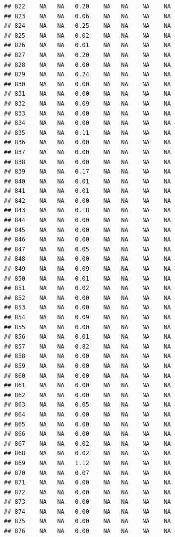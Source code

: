 \documentclass{article}\usepackage{graphicx, color}
\makeatletter
\newenvironment{kframe}{%
 \def\at@end@of@kframe{}%
 \ifinner\ifhmode%
  \def\at@end@of@kframe{\end{minipage}}%
  \begin{minipage}{\columnwidth}%
 \fi\fi%
 \def\FrameCommand##1{\hskip\@totalleftmargin \hskip-\fboxsep
 \colorbox{shadecolor}{##1}\hskip-\fboxsep
     \hskip-\linewidth \hskip-\@totalleftmargin \hskip\columnwidth}%
 \MakeFramed {\advance\hsize-\width
   \@totalleftmargin\z@ \linewidth\hsize
   \@setminipage}}%
 {\par\unskip\endMakeFramed%
 \at@end@of@kframe}
\newenvironment{knitrout}{}{} %
\makeatother
\begin{document}
\begin{knitrout}
\begin{kframe}
\begin{verbatim}
## 822    NA   NA   0.20    NA   NA    NA    NA
## 823    NA   NA   0.06    NA   NA    NA    NA
## 824    NA   NA   0.25    NA   NA    NA    NA
## 825    NA   NA   0.02    NA   NA    NA    NA
## 826    NA   NA   0.01    NA   NA    NA    NA
## 827    NA   NA   0.20    NA   NA    NA    NA
## 828    NA   NA   0.00    NA   NA    NA    NA
## 829    NA   NA   0.24    NA   NA    NA    NA
## 830    NA   NA   0.00    NA   NA    NA    NA
## 831    NA   NA   0.00    NA   NA    NA    NA
## 832    NA   NA   0.09    NA   NA    NA    NA
## 833    NA   NA   0.00    NA   NA    NA    NA
## 834    NA   NA   0.00    NA   NA    NA    NA
## 835    NA   NA   0.11    NA   NA    NA    NA
## 836    NA   NA   0.00    NA   NA    NA    NA
## 837    NA   NA   0.00    NA   NA    NA    NA
## 838    NA   NA   0.00    NA   NA    NA    NA
## 839    NA   NA   0.17    NA   NA    NA    NA
## 840    NA   NA   0.01    NA   NA    NA    NA
## 841    NA   NA   0.01    NA   NA    NA    NA
## 842    NA   NA   0.00    NA   NA    NA    NA
## 843    NA   NA   0.18    NA   NA    NA    NA
## 844    NA   NA   0.00    NA   NA    NA    NA
## 845    NA   NA   0.00    NA   NA    NA    NA
## 846    NA   NA   0.00    NA   NA    NA    NA
## 847    NA   NA   0.05    NA   NA    NA    NA
## 848    NA   NA   0.00    NA   NA    NA    NA
## 849    NA   NA   0.09    NA   NA    NA    NA
## 850    NA   NA   0.01    NA   NA    NA    NA
## 851    NA   NA   0.02    NA   NA    NA    NA
## 852    NA   NA   0.00    NA   NA    NA    NA
## 853    NA   NA   0.00    NA   NA    NA    NA
## 854    NA   NA   0.09    NA   NA    NA    NA
## 855    NA   NA   0.00    NA   NA    NA    NA
## 856    NA   NA   0.01    NA   NA    NA    NA
## 857    NA   NA   0.82    NA   NA    NA    NA
## 858    NA   NA   0.00    NA   NA    NA    NA
## 859    NA   NA   0.00    NA   NA    NA    NA
## 860    NA   NA   0.00    NA   NA    NA    NA
## 861    NA   NA   0.00    NA   NA    NA    NA
## 862    NA   NA   0.00    NA   NA    NA    NA
## 863    NA   NA   0.05    NA   NA    NA    NA
## 864    NA   NA   0.00    NA   NA    NA    NA
## 865    NA   NA   0.00    NA   NA    NA    NA
## 866    NA   NA   0.00    NA   NA    NA    NA
## 867    NA   NA   0.02    NA   NA    NA    NA
## 868    NA   NA   0.02    NA   NA    NA    NA
## 869    NA   NA   1.12    NA   NA    NA    NA
## 870    NA   NA   0.07    NA   NA    NA    NA
## 871    NA   NA   0.00    NA   NA    NA    NA
## 872    NA   NA   0.00    NA   NA    NA    NA
## 873    NA   NA   0.00    NA   NA    NA    NA
## 874    NA   NA   0.00    NA   NA    NA    NA
## 875    NA   NA   0.00    NA   NA    NA    NA
## 876    NA   NA   0.00    NA   NA    NA    NA

\end{verbatim}
\end{kframe}
\end{knitrout}
\end{document}
